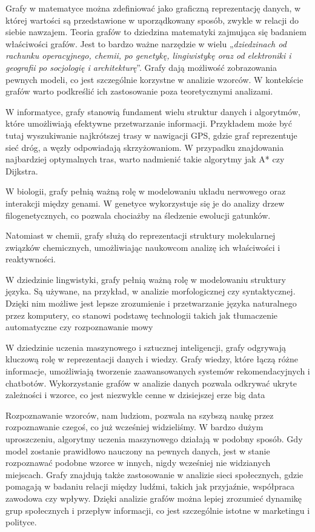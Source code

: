Grafy w matematyce można zdefiniować jako graficzną reprezentację danych,
w której wartości są przedstawione w uporządkowany sposób,
zwykle w relacji do siebie nawzajem.
Teoria grafów to dziedzina matematyki zajmująca się badaniem właściwości grafów.
Jest to bardzo ważne narzędzie w wielu „\textit{dziedzinach od rachunku operacyjnego, chemii, po genetykę, lingiwistykę
oraz od elektroniki i geografii po socjologię i architekturę}”\cite{Wilson2012}.
Grafy dają możliwość zobrazowania pewnych modeli, co jest szczególnie korzystne w analizie wzorców.
W kontekście grafów warto podkreślić ich zastosowanie poza teoretycznymi analizami.

W informatyce, grafy stanowią fundament wielu struktur danych i algorytmów, które umożliwiają efektywne przetwarzanie informacji.
Przykładem może być tutaj wyszukiwanie najkrótszej trasy w nawigacji GPS, gdzie graf reprezentuje sieć dróg, a węzły odpowiadają skrzyżowaniom.
W przypadku znajdowania najbardziej optymalnych tras, warto nadmienić takie algorytmy jak A* czy Dijkstra.

W biologii, grafy pełnią ważną rolę w modelowaniu układu nerwowego oraz interakcji między genami.
W genetyce wykorzystuje się je do analizy drzew filogenetycznych, co pozwala chociażby na śledzenie ewolucji gatunków.

Natomiast w chemii, grafy służą do reprezentacji struktury molekularnej związków chemicznych,
umożliwiając naukowcom analizę ich właściwości i reaktywności.

W dziedzinie lingwistyki, grafy pełnią ważną rolę w modelowaniu struktury języka.
Są używane, na przykład, w analizie morfologicznej czy syntaktycznej.
Dzięki nim możliwe jest lepsze zrozumienie i przetwarzanie języka naturalnego przez komputery,
co stanowi podstawę technologii takich jak tłumaczenie automatyczne czy rozpoznawanie mowy

W dziedzinie uczenia maszynowego i sztucznej inteligencji, grafy odgrywają kluczową rolę w reprezentacji danych i wiedzy.
Grafy wiedzy, które łączą różne informacje, umożliwiają tworzenie zaawansowanych systemów rekomendacyjnych i chatbotów.
Wykorzystanie grafów w analizie danych pozwala odkrywać ukryte zależności i wzorce, co jest niezwykle cenne w dzisiejszej erze big data

Rozpoznawanie wzorców, nam ludziom, pozwala na szybszą naukę przez rozpoznawanie czegoś, co już wcześniej widzieliśmy.
W bardzo dużym uproszczeniu, algorytmy uczenia maszynowego działają w podobny sposób.
Gdy model zostanie prawidłowo nauczony na pewnych danych, jest w stanie rozpoznawać podobne wzorce w innych,
nigdy wcześniej nie widzianych miejscach.
Grafy znajdują także zastosowanie w analizie sieci społecznych, gdzie pomagają w badaniu relacji między ludźmi,
takich jak przyjaźnie, współpraca zawodowa czy wpływy.
Dzięki analizie grafów można lepiej zrozumieć dynamikę grup społecznych i przepływ informacji,
co jest szczególnie istotne w marketingu i polityce.

